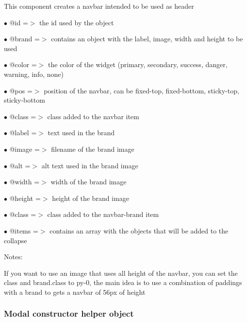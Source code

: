 \documentclass[a4paper]{article}
\begin{document}
This component creates a navbar intended to be used as header

\begin{compactitem}
\item[\color{myblue}$\bullet$] @id    =$>$ the id used by the object
\item[\color{myblue}$\bullet$] @brand =$>$ contains an object with the label, image, width and height to be used
\item[\color{myblue}$\bullet$] @color =$>$ the color of the widget (primary, secondary, success, danger, warning, info, none)
\item[\color{myblue}$\bullet$] @pos   =$>$ position of the navbar, can be fixed-top, fixed-bottom, sticky-top, sticky-bottom
\item[\color{myblue}$\bullet$] @class =$>$ class added to the navbar item
\end{compactitem}

\begin{compactitem}
\item[\color{myblue}$\bullet$] @label  =$>$ text used in the brand
\item[\color{myblue}$\bullet$] @image  =$>$ filename of the brand image
\item[\color{myblue}$\bullet$] @alt    =$>$ alt text used in the brand image
\item[\color{myblue}$\bullet$] @width  =$>$ width of the brand image
\item[\color{myblue}$\bullet$] @height =$>$ height of the brand image
\item[\color{myblue}$\bullet$] @class  =$>$ class added to the navbar-brand item
\end{compactitem}

\begin{compactitem}
\item[\color{myblue}$\bullet$] @items =$>$ contains an array with the objects that will be added to the collapse
\end{compactitem}

Notes:

If you want to use an image that uses all height of the navbar, you can set the class and
brand.class to py-0, the main idea is to use a combination of paddings with a brand to
gets a navbar of 56px of height

\hypertarget{toc662}{}
\subsubsection{Modal constructor helper object}
\end{document}
